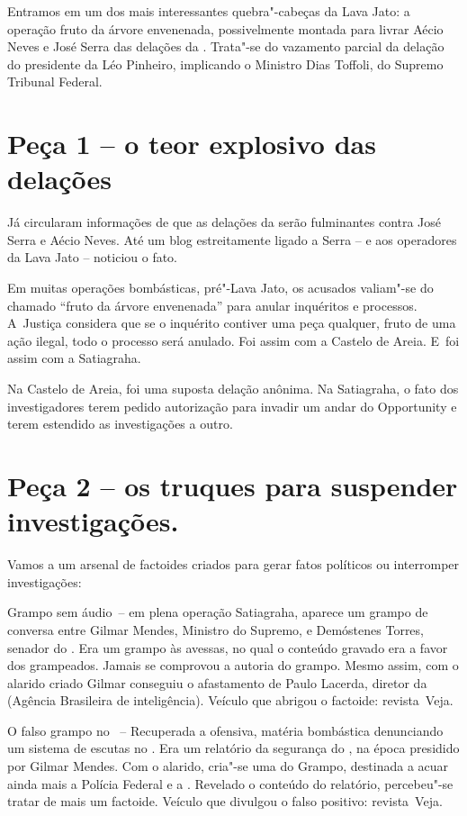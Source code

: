  

Entramos em um dos mais interessantes quebra"-cabeças da Lava Jato: a
operação fruto da árvore envenenada, possivelmente montada para livrar
Aécio Neves e José Serra das delações da . Trata"-se do vazamento
parcial da delação do presidente da  Léo Pinheiro, implicando o
Ministro Dias Toffoli, do Supremo Tribunal Federal.

\section{Peça 1 -- o teor explosivo das delações}

Já circularam informações de que as delações da  serão fulminantes
contra José Serra e Aécio Neves. Até um blog estreitamente ligado a
Serra -- e aos operadores da Lava Jato -- noticiou o fato.

Em muitas operações bombásticas, pré"-Lava Jato, os acusados valiam"-se do
chamado ``fruto da árvore envenenada'' para anular inquéritos e
processos. A~Justiça considera que se o inquérito contiver uma peça
qualquer, fruto de uma ação ilegal, todo o processo será anulado. Foi
assim com a Castelo de Areia. E~foi assim com a Satiagraha.

Na Castelo de Areia, foi uma suposta delação anônima. Na Satiagraha, o
fato dos investigadores terem pedido autorização para invadir um andar
do Opportunity e terem estendido as investigações a outro.

\section{Peça 2 -- os truques para suspender investigações.}

Vamos a um arsenal de factoides criados para gerar fatos políticos ou
interromper investigações:

Grampo sem áudio~-- em plena operação Satiagraha, aparece um grampo de
conversa entre Gilmar Mendes, Ministro do Supremo, e Demóstenes Torres,
senador do . Era um grampo às avessas, no qual o conteúdo gravado era
a favor dos grampeados. Jamais se comprovou a autoria do grampo. Mesmo
assim, com o alarido criado Gilmar conseguiu o afastamento de Paulo
Lacerda, diretor da  (Agência Brasileira de inteligência). Veículo
que abrigou o factoide: revista~Veja.

O falso grampo no ~-- Recuperada a ofensiva, matéria bombástica
denunciando um sistema de escutas no . Era um relatório da segurança
do , na época presidido por Gilmar Mendes. Com o alarido, cria"-se uma
 do Grampo, destinada a acuar ainda mais a Polícia Federal e a .
Revelado o conteúdo do relatório, percebeu"-se tratar de mais um
factoide. Veículo que divulgou o falso positivo: revista~Veja.

